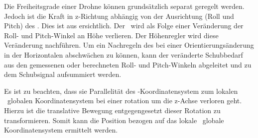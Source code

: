 Die Freiheitsgrade einer Drohne können grundsätzlich separat geregelt werden.
Jedoch ist die Kraft in z-Richtung abhängig von der Ausrichtung (Roll und Pitch) des \Quad[s]. Dies ist aus  ersichtlich. Der \Quad\ wird als Folge einer Veränderung der Roll- und Pitch-Winkel an Höhe verlieren. Der Höhenregler wird diese Veränderung nachführen.
Um ein Nachregeln des \Quad[s] bei einer Orientierungsänderung in der Horizontalen abschwächen zu können, kann der veränderte Schubbedarf aus den gemessenen oder berechneten Roll- und Pitch-Winkeln abgeleitet und zu dem Schubsignal aufsummiert werden.


Es ist zu beachten, dass sie Parallelität des \Quad-Koordinatensystem zum lokalen \bzw\ globalen Koordinatensystem bei einer rotation um die z-Achse verloren geht. Hierzu ist die translative Bewegung entgegengesetzt dieser Rotation zu transformieren. Somit kann die Position bezogen auf das lokale \bzw\ globale Koordinatensystem ermittelt werden. 


